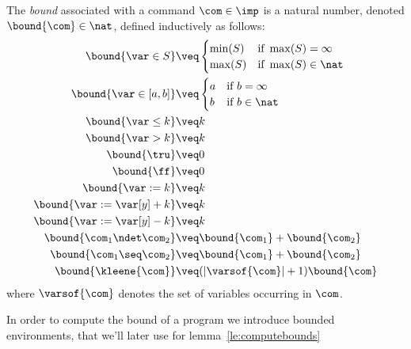 \begin{definition}
  \label{de:bound}
  The \emph{bound} associated with a command \(\com\in \imp\) is a
  natural number, denoted \(\bound{\com}\in \nat\), defined
  inductively as follows:
  \begin{align*}
    \bound{\var \in S}  
    & \veq \begin{cases}
      \min(S) & \text{if } \max(S)=\infty\\
      \max(S) & \text{if } \max(S)\in \nat
    \end{cases}
    \\
    \bound{\var \in [a,b]}  
    & \veq \begin{cases}
      a & \text{if } b=\infty\\
      b & \text{if } b\in \nat
    \end{cases}
    \\
    \bound{\var \leq k}  
    & \veq k\\
    \bound{\var > k} 
    & \veq k\\
    \bound{\tru} 
    & \veq 0\\
    \bound{\ff} 
    & \veq 0\\
    \bound{\var := k} 
    & \veq k\\
    \bound{\var := \var[y] + k}
    & \veq k\\
    \bound{\var := \var[y] - k}
    & \veq k\\
    \bound{\com_1 \ndet \com_2}
    & \veq \bound{\com_1} + \bound{\com_2}\\
    \bound{\com_1 \seq \com_2}
    & \veq \bound{\com_1} + \bound{\com_2}\\
    \bound{\kleene{\com}}
    & \veq (|\varsof{\com}|+1) \bound{\com} \\ 
  \end{align*}
  where \(\varsof{\com}\) denotes the set of variables occurring in 
  \(\com\).
\end{definition}

In order to compute the bound of a program we introduce bounded
environments, that we'll later use for lemma~\ref{le:computebounds}

